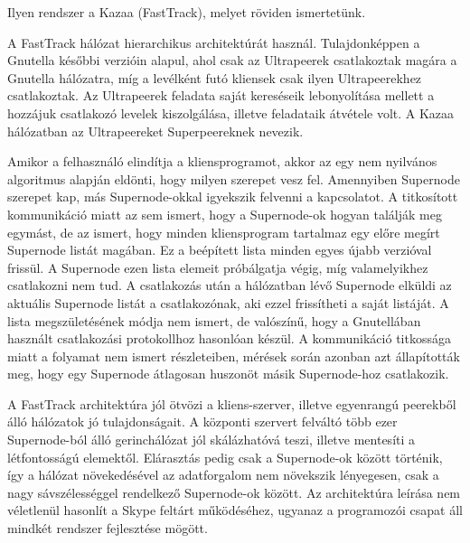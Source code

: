 \documentclass[a4paper]{article}
\begin{document}
Ilyen rendszer a Kazaa (FastTrack), melyet röviden ismertetünk.

A FastTrack hálózat hierarchikus architektúrát használ. Tulajdonképpen a Gnutella későbbi verzióin alapul, ahol csak az Ultrapeerek csatlakoztak magára a Gnutella hálózatra, míg a levélként futó kliensek csak ilyen Ultrapeerekhez csatlakoztak. Az Ultrapeerek feladata saját kereséseik lebonyolítása mellett a hozzájuk csatlakozó levelek kiszolgálása, illetve feladataik átvétele volt. A Kazaa hálózatban az Ultrapeereket Superpeereknek nevezik.

Amikor a felhasználó elindítja a kliensprogramot, akkor az egy nem nyilvános algoritmus alapján eldönti, hogy milyen szerepet vesz fel. Amennyiben Supernode szerepet kap, más Supernode-okkal igyekszik felvenni a kapcsolatot. A titkosított kommunikáció miatt az sem ismert, hogy a Supernode-ok hogyan találják meg egymást, de az ismert, hogy minden kliensprogram tartalmaz egy előre megírt Supernode listát magában. Ez a beépített lista minden egyes újabb verzióval frissül. A Supernode ezen lista elemeit próbálgatja végig, míg valamelyikhez csatlakozni nem tud. A csatlakozás után a hálózatban lévő Supernode elküldi az aktuális Supernode listát a csatlakozónak, aki ezzel frissítheti a saját listáját. A lista megszületésének módja nem ismert, de valószínű, hogy a Gnutellában használt csatlakozási protokollhoz hasonlóan készül. A kommunikáció titkossága miatt a folyamat nem ismert részleteiben, mérések során azonban azt állapították meg, hogy egy Supernode átlagosan huszonöt másik Supernode-hoz csatlakozik.

A FastTrack architektúra jól ötvözi a kliens-szerver, illetve egyenrangú peerekből álló hálózatok jó tulajdonságait. A központi szervert felváltó több ezer Supernode-ból álló gerinchálózat jól skálázhatóvá teszi, illetve mentesíti a létfontosságú elemektől. Elárasztás pedig csak a Supernode-ok között történik, így a hálózat növekedésével az adatforgalom nem növekszik lényegesen, csak a nagy sávszélességgel rendelkező Supernode-ok között. Az architektúra leírása nem véletlenül hasonlít a Skype feltárt működéséhez, ugyanaz a programozói csapat áll mindkét rendszer fejlesztése mögött.
\end{document}
